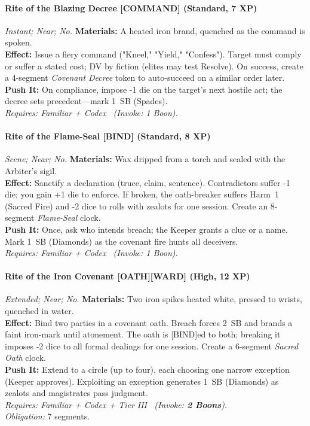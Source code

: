 \paragraph{Rite of the Blazing Decree \textnormal{[COMMAND]} (Standard, 7 XP)} \emph{Instant; Near; No.}
\textbf{Materials:} A heated iron brand, quenched as the command is spoken.\\
\textbf{Effect:} Issue a fiery command ("Kneel," "Yield," "Confess"). Target must comply or suffer a stated cost; DV by fiction (elites may test Resolve). On success, create a 4-segment \emph{Covenant Decree} token to auto-succeed on a similar order later.\\
\textbf{Push It:} On compliance, impose -1 die on the target’s next hostile act; the decree sets precedent—mark 1~SB (Spades).\\
\emph{Requires: Familiar + Codex \ (\textit{Invoke:} 1 Boon).}

\paragraph{Rite of the Flame-Seal \textnormal{[BIND]} (Standard, 8 XP)} \emph{Scene; Near; No.}
\textbf{Materials:} Wax dripped from a torch and sealed with the Arbiter’s sigil.\\
\textbf{Effect:} Sanctify a declaration (truce, claim, sentence). Contradictors suffer -1 die; you gain +1 die to enforce. If broken, the oath-breaker suffers Harm~1 (Sacred Fire) and -2 dice to rolls with zealots for one session. Create an 8-segment \emph{Flame-Seal} clock.\\
\textbf{Push It:} Once, ask who intends breach; the Keeper grants a clue or a name. Mark 1~SB (Diamonds) as the covenant fire hunts all deceivers.\\
\emph{Requires: Familiar + Codex \ (\textit{Invoke:} 1 Boon).}

\paragraph{Rite of the Iron Covenant \textnormal{[OATH][WARD]} (High, 12 XP)} \emph{Extended; Near; No.}
\textbf{Materials:} Two iron spikes heated white, pressed to wrists, quenched in water.\\
\textbf{Effect:} Bind two parties in a covenant oath. Breach forces 2~SB and brands a faint iron-mark until atonement. The oath is [BIND]ed to both; breaking it imposes -2 dice to all formal dealings for one session. Create a 6-segment \emph{Sacred Oath} clock.\\
\textbf{Push It:} Extend to a circle (up to four), each choosing one narrow exception (Keeper approves). Exploiting an exception generates 1~SB (Diamonds) as zealots and magistrates pass judgment.\\
\emph{Requires: Familiar + Codex + Tier III \ (\textit{Invoke:} \textbf{2 Boons}).}\\
\emph{Obligation:} 7 segments.

